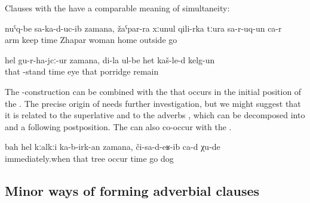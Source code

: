 Clauses with the  have a comparable meaning of simultaneity:
%
\begin{exe}
	\ex	\label{ex:‎While he presented the condolences (lit. kept his hands in front), Zhapar's wife entered}
	\gll	nuˁq-be	sa-ka-d-uc-ib		zamana,	žaˁpar-ra	xːunul	qili-rka	tːura	sa-r-uq-un	ca-r\\
		arm	keep	time	Zhapar	woman	home	outside 	go	\\
	\glt	{}

	\ex	\label{ex:‎While I got up, my eyes remained on the porridge}
	\gll	hel	gu-r-ha-jcː-ur	zamana,	di-la	ul-be	het	kaš-le-d	kelg-un\\
		that	-stand	time		eye	that	porridge	remain\\
	\glt	{}
\end{exe}

The -construction can be combined with the    that occurs in the initial position of the  . The precise origin of  needs further investigation, but we might suggest that it is related to the superlative    and to the adverbs  , which can be decomposed into  and a following postposition. The  can also co-occur with the  .
%
\begin{exe}
	\ex	\label{ex:‎When this tree already felt down, the dogs were coming}
	\gll	bah	hel	kːalkːi	ka-b-irk-an	zamana,	či-sa-d-eʁ-ib	ca-d	χu-de\\
		immediately.when	that	tree	occur	time	go		dog\\
	\glt	{}
\end{exe}



\subsection{Minor ways of forming adverbial clauses}
\label{sec:minor ways of forming adverbial clauses}

